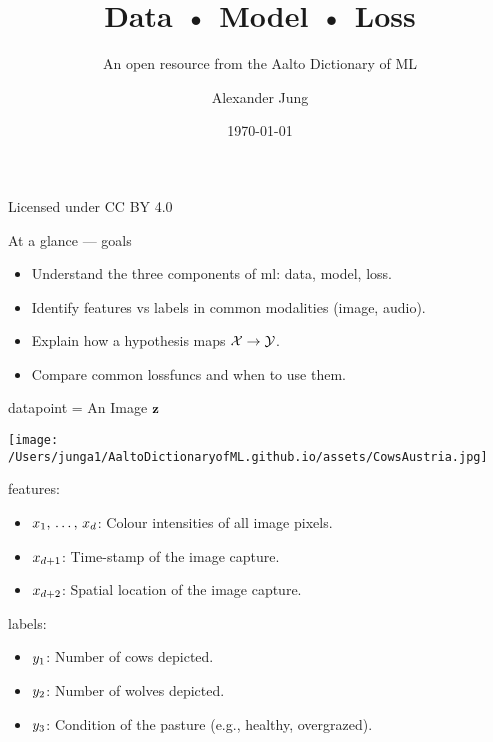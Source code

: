 \documentclass[12pt]{beamer}
\title{Data • Model • Loss}
\subtitle{An open resource from the Aalto Dictionary of ML}
\author{Alexander Jung}
\date{\today}
\begin{document}
	\begin{frame}
		\titlepage
		\vspace{3mm}
		\footnotesize Licensed under CC BY 4.0 \quad
	\end{frame}
	
	
	\begin{frame}{At a glance — goals}
		\begin{itemize}
			\item Understand the three components of \gls{ml}: \gls{data}, \gls{model}, \gls{loss}.
			\item Identify \glspl{feature} vs \glspl{label} in common modalities (image, audio).
			\item Explain how a \gls{hypothesis} maps \(\mathcal{X} \to \mathcal{Y}\).
			\item Compare common \glspl{lossfunc} and when to use them.
		\end{itemize}
	\end{frame}
	

	
	\begin{frame}{\Gls{datapoint} = An Image ${\bf z}$}
			\begin{minipage}[t]{0.4\textwidth}
				\centering
				\texttt{[image: /Users/junga1/AaltoDictionaryofML.github.io/assets/CowsAustria.jpg]}
				\vspace{1mm}
			\end{minipage}

				\Glspl{feature}:
				\begin{itemize}
					\item $x_{1}, \,\ldots, \,x_{d}$: Colour intensities of all image pixels.
					\item $x_{d+1}$: Time-stamp of the image capture.
					\item $x_{d+2}$: Spatial location of the image capture.
				\end{itemize}
				\Glspl{label}:
				\begin{itemize}
					\item $y_{1}$: Number of cows depicted. 
					\item $y_{2}$: Number of wolves depicted. 
					\item $y_{3}$: Condition of the pasture (e.g., healthy, overgrazed).
				\end{itemize}
	\end{frame}
	
\end{document}
